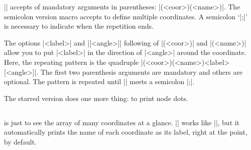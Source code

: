 |\tzcoor| accepts  of mandatory arguments in parentheses: |(<coor>)(<name>)|.
The semicolon version macro \icmd{\tzcoors} accepts  to define multiple coordinates. A semicolon `|;|' is necessary to indicate when the repetition ends.

\begin{tzcode}{.3}
\end{tzcode}

The options |{<label>}| and |[<angle>]| following  of |(<coor>)| and |(<name>)| allow you to put |<label>| in the direction of |<angle>| around the coordinate.
Here, the repeating pattern is the quadruple |(<coor>)(<name>){<label>}[<angle>]|. The first two parenthesis arguments are mandatory and others are optional. The pattern is repeated until |\tzcoors| meets a semicolon |;|.

\begin{tzcode}{.3}
\end{tzcode}


The starred version \icmd{\tzcoors*} does one more thing: to print node dots.

\begin{tzcode}{.3}
\end{tzcode}



\subsection{\protect\cmd{\tzcoorsquick}}
\label{ssi:tzcoorsquick}

\icmd{\tzcoorsquick} is just to see the array of many coordinates at a glance.
|\tzcoorsquick| works like |\tzcoors|, but it automatically prints the name of each coordinate as its label, right at the point, by default.

